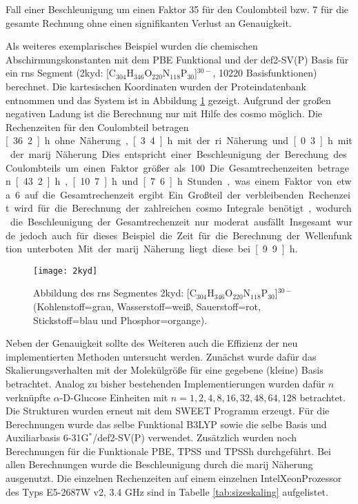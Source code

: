 Fall einer Beschleunigung um einen Faktor 35 für den Coulombteil bzw. 7 für die gesamte Rechnung ohne einen signifikanten Verlust an Genauigkeit. 

Als weiteres exemplarisches Beispiel wurden die chemischen Abschirmungskonstanten mit dem PBE Funktional und der def2-SV(P) Basis für ein \ac{rns} Segment (2kyd\supercite{2kydstructure}: [C$_{304}$H$_{346}$O$_{220}$N$_{118}$P$_{30}$]$^{30-}$, 10220 Basisfunktionen) berechnet. Die kartesischen Koordinaten wurden der Proteindatenbank entnommen und das System ist in Abbildung \ref{abb:2kyd} gezeigt. Aufgrund der großen negativen Ladung ist die Berechnung nur mit Hilfe des \ac{cosmo} möglich. Die Rechenzeiten für den Coulombteil betragen \unit[36.2]{h} ohne Näherung, \unit[3.4]{h} mit der \ac{ri} Näherung und \unit[0.3]{h} mit der \ac{marij} Näherung. Dies entspricht einer Beschleunigung der Berechung des Coulombteils um einen Faktor größer als 100. Die Gesamtrechenzeiten betragen \unit[43.2]{h}, \unit[10.7]{h} und \unit[7.6]{h} Stunden, was einem Faktor von etwa 6 auf die Gesamtrechenzeit ergibt. Ein Großteil der verbleibenden Rechenzeit wird für die Berechnung der zahlreichen \ac{cosmo} Integrale benötigt, wodurch die Beschleunigung der Gesamtrechenzeit nur moderat ausfällt. Insgesamt wurde jedoch auch für dieses Beispiel die Zeit für die Berechnung der Wellenfunktion unterboten. Mit der \ac{marij} Näherung liegt diese bei \unit[9.9]{h}.

\begin{figure}[ht!]
	\centering
	\texttt{[image: 2kyd]}
	\captionsetup{figurewithin = chapter}
	\captionsetup{font=small, labelfont=bf}\caption[{Abbildung eines \ac{rns} Segmentes}]{Abbildung des \ac{rns} Segmentes 2kyd: [C$_{304}$H$_{346}$O$_{220}$N$_{118}$P$_{30}$]$^{30-}$ (Kohlenstoff=grau, Wasserstoff=weiß, Sauerstoff=rot, Stickstoff=blau und Phosphor=organge).}
\label{abb:2kyd}
\end{figure}

\bigskip
Neben der Genauigkeit sollte des Weiteren auch die Effizienz der neu implementierten Methoden untersucht werden. Zunächst wurde dafür das Skalierungsverhalten mit der Molekülgröße für eine gegebene (kleine) Basis betrachtet. Analog zu bisher bestehenden Implementierungen\supercite{beer2011nuclei,kumar2016nuclei} wurden dafür $n$ verknüpfte $\alpha$-D-Glucose Einheiten mit $n=1,2,4,8,16,32,48,64,128$ betrachtet. Die Strukturen wurden erneut mit dem SWEET Programm erzeugt. Für die Berechnungen wurde das selbe Funktional B3LYP sowie die selbe Basis und Auxiliarbasis 6-31G$^*$/def2-SV(P) verwendet. Zusätzlich wurden noch Berechnungen für die Funktionale PBE, TPSS und TPSSh durchgeführt. Bei allen Berechnungen wurde die Beschleunigung durch die \ac{marij} Näherung ausgenutzt. Die einzelnen Rechenzeiten auf einem einzelnen Intel\textregistered Xeon\textregistered Prozessor des Typs E5-2687W v2, 3.4 GHz sind in Tabelle \ref{tab:sizeskaling} aufgelistet. 

